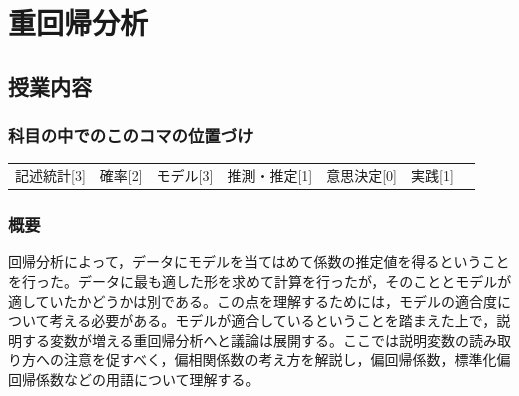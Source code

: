 \section{重回帰分析}
\label{lesson09}

\subsection{授業内容}
\subsubsection{科目の中でのこのコマの位置づけ}
\begin{tabular}[t]{ccccccc}
    記述統計[3] & 確率[2] & モデル[3] & 推測・推定[1] & 意思決定[0] & 実践[1]
\end{tabular}

\subsubsection{概要}
回帰分析によって，データにモデルを当てはめて係数の推定値を得るということを行った。データに最も適した形を求めて計算を行ったが，そのこととモデルが適していたかどうかは別である。この点を理解するためには，モデルの適合度について考える必要がある。モデルが適合しているということを踏まえた上で，説明する変数が増える重回帰分析へと議論は展開する。ここでは説明変数の読み取り方への注意を促すべく，偏相関係数の考え方を解説し，偏回帰係数，標準化偏回帰係数などの用語について理解する。
